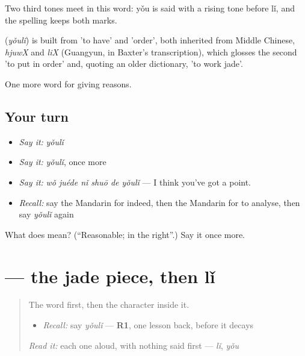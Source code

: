 Two third tones meet in this word: yǒu is said with a rising tone before lǐ, and the spelling keeps both marks.

\begin{cousinweb}
\textbf{} (\emph{yǒulǐ}) is built from  'to have' and  'order', both inherited from Middle Chinese, \emph{hjuwX} and \emph{liX} (Guangyun, in Baxter's transcription), which glosses the second 'to put in order' and, quoting an older dictionary, 'to work jade'.
\end{cousinweb}

\begin{grammarlens}[title={What you've built}]
One more word for giving reasons.
\end{grammarlens}

\subsection*{Your turn}
\begin{itemize}
\raggedright
  \item \emph{Say it:} \emph{yǒulǐ}
  \item \emph{Say it:} \emph{yǒulǐ}, once more
  \item \emph{Say it:} \emph{wǒ juéde nǐ shuō de yǒulǐ} — I think you've got a point.
  \item \emph{Recall:} say the Mandarin for indeed, then the Mandarin for to analyse, then say \emph{yǒulǐ} again
\end{itemize}

\begin{tcolorbox}[breakable,colback=teal!4,colframe=teal!35!black,title={Before you move on}]
What does  mean? (\textquotedblleft{}Reasonable; in the right\textquotedblright{}.) Say it once more.
\end{tcolorbox}
\section[\texorpdfstring{\zh{理} (lǐ)}{理 (lǐ)}]{ — the jade piece, then lǐ}

\label{lesson:ZH-W351-li-reason}



\begin{quote}
The word first, then the character inside it.

\begin{itemize}
\raggedright
  \item \emph{Recall:} say \emph{yǒulǐ} — \textbf{R1}, one lesson back, before it decays
\end{itemize}

\begin{quote}
 
\end{quote}

\emph{Read it:} each one aloud, with nothing said first — \emph{lǐ}, \emph{yǒu}
\end{quote}

